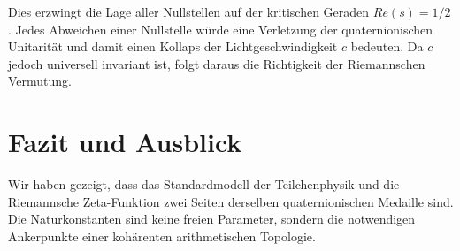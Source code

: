 \documentclass[12pt,a4paper]{article}
\begin{document}
	
	
	Dies erzwingt die Lage aller Nullstellen auf der kritischen Geraden $Re(s) = 1/2$. Jedes Abweichen einer Nullstelle würde eine Verletzung der quaternionischen Unitarität und damit einen Kollaps der Lichtgeschwindigkeit $c$ bedeuten. Da $c$ jedoch universell invariant ist, folgt daraus die Richtigkeit der Riemannschen Vermutung.
	
	\section{Fazit und Ausblick}
	Wir haben gezeigt, dass das Standardmodell der Teilchenphysik und die Riemannsche Zeta-Funktion zwei Seiten derselben quaternionischen Medaille sind. Die Naturkonstanten sind keine freien Parameter, sondern die notwendigen Ankerpunkte einer kohärenten arithmetischen Topologie. 
	
\end{document}
